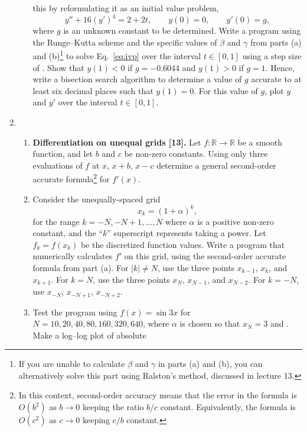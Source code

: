 \documentclass[11pt]{article}
\newcommand{\R}{\mathbb{R}}
\begin{document}
\begin{enumerate}
\begin{enumerate}
	this by reformulating it as an initial value problem,
	\begin{equation}
	  y''+16(y')^4=2+2t, \qquad y(0)=0, \qquad y'(0)=g, \label{eq:ivp}
	\end{equation}
	where $g$ is an unknown constant to be determined. Write a program
	using the Runge--Kutta scheme and the specific values of $\beta$ and
	$\gamma$ from parts (a) and (b)\footnote{If you are unable to calculate
	$\beta$ and $\gamma$ in parts (a) and (b), you can alternatively solve
	this part using Ralston's method, discussed in lecture 13.} to solve
	Eq.~\ref{eq:ivp} over the interval $t\in [0,1]$ using a step size of
	. Show that $y(1)<0$ if $g=-0.6044$ and
	$y(1)>0$ if $g=1$. Hence, write a bisection search algorithm to
	determine a value of $g$ accurate to at least six decimal places such
	that $y(1)=0$. For this value of $g$, plot $y$ and $y'$ over the
	interval $t\in[0,1]$.
    \end{enumerate}
  \item 
    \begin{enumerate}
      \item \textbf{Differentiation on unequal grids [13].} Let $f:\R \to \R$ be a
	smooth function, and let $b$ and $c$ be non-zero constants. Using only
	three evaluations of $f$ at $x$, $x+b$, $x-c$ determine a general
	second-order accurate formula\footnote{In this context, second-order
	accuracy means that the error in the formula is $O(b^2)$ as $b\to 0$
	keeping the ratio $b/c$ constant. Equivalently, the formula is $O(c^2)$
	as $c\to 0$ keeping $c/b$ constant.} for $f'(x)$.
      \item Consider the unequally-spaced grid
	\begin{equation}
	  x_k = (1+\alpha)^k,
	\end{equation}
	for the range $k=-N,-N+1,\ldots, N$ where $\alpha$ is a positive
	non-zero constant, and the ``$k$'' superscript represents taking a
	power. Let $f_k=f(x_k)$ be the discretized function values. Write
	a program that numerically calculates $f'$ on this grid, using the
	second-order accurate formula from part (a). For $|k|\ne N$, use the
	three points $x_{k-1}$, $x_k$, and $x_{k+1}$. For $k=N$, use the three
	points $x_N$, $x_{N-1}$, and $x_{N-2}$. For $k=-N$, use $x_{-N}$,
	$x_{-N+1}$, $x_{-N+2}$.
      \item Test the program using $f(x)=\sin 3x$ for $N=10,20,40,80,160,320,640$,
	where $\alpha$ is chosen so that $x_N=3$ and
	. Make a log--log plot of absolute

\end{enumerate}
\end{enumerate}
\end{document}
